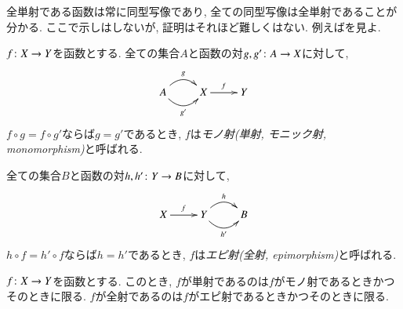\begin{remark}


全単射である函数は常に同型写像であり, 全ての同型写像は全単射であることが分かる. ここで示しはしないが, 証明はそれほど難しくはない. 例えば\cite[Theorem 5.4]{Big}を見よ.

\end{remark}

\begin{definition}\label{def:mono, epi in set}



$f\colon X\rightarrow Y$を函数とする.
全ての集合$A$と函数の対$g,g'\colon A\rightarrow X$に対して,
$$
\xymatrix{A\ar@/^1pc/[r]^g\ar@/_1pc/[r]_{g'}&X\ar[r]^f&Y}
$$
$f\circ g=f\circ g'$ならば$g=g'$であるとき, $f$は\emph{モノ射(単射, モニック射, monomorphism)}と呼ばれる.


全ての集合$B$と函数の対$h,h'\colon Y\rightarrow B$に対して,
$$
\xymatrix{X\ar[r]^f&Y\ar@/^1pc/[r]^h\ar@/_1pc/[r]_{h'}&B}
$$
$h\circ f=h'\circ f$ならば$h=h'$であるとき, $f$は\emph{エピ射(全射, epimorphism)}と呼ばれる.

\end{definition}

\begin{proposition}\label{prop:inj and surj}


$f\colon X\rightarrow Y$を函数とする. このとき, $f$が単射であるのは$f$がモノ射であるときかつそのときに限る. $f$が全射であるのは$f$がエピ射であるときかつそのときに限る.

\end{proposition}

